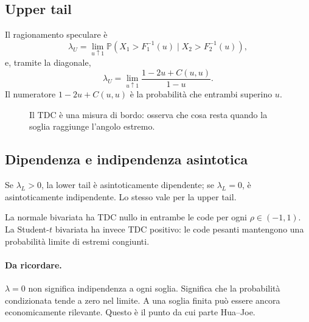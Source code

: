 \documentclass[11pt,a4paper]{article}
\newcommand{\Prob}{\mathbb{P}}
\newcommand{\Ricorda}{\paragraph{Da ricordare.}}
\begin{document}
\subsection{Upper tail}

Il ragionamento speculare è
\begin{equation}
 \lambda_U=\lim_{u\uparrow1}
 \Prob\!\left(X_1>F_1^{-1}(u)\mid X_2>F_2^{-1}(u)\right),
 \label{eq:lambda-upper-cond}
\end{equation}
e, tramite la diagonale,
\begin{equation}
 \lambda_U=\lim_{u\uparrow1}
 \frac{1-2u+C(u,u)}{1-u}.
 \label{eq:lambda-upper-copula}
\end{equation}
Il numeratore $1-2u+C(u,u)$ è la probabilità che entrambi superino $u$.

\begin{figure}[ht]
\centering
{}
\caption{Il TDC è una misura di bordo: osserva che cosa resta quando la soglia raggiunge l'angolo estremo.}
\label{fig:tdc-corner}
\end{figure}

\subsection{Dipendenza e indipendenza asintotica}

Se $\lambda_L>0$, la lower tail è asintoticamente dipendente; se
$\lambda_L=0$, è asintoticamente indipendente. Lo stesso vale per la upper
tail.

La normale bivariata ha TDC nullo in entrambe le code per ogni
$\rho\in(-1,1)$. La Student-$t$ bivariata ha invece TDC positivo: le code
pesanti mantengono una probabilità limite di estremi congiunti.

\Ricorda $\lambda=0$ non significa indipendenza a ogni soglia. Significa che
la probabilità condizionata tende a zero nel limite. A una soglia finita può
essere ancora economicamente rilevante. Questo è il punto da cui parte
Hua--Joe.
\end{document}

